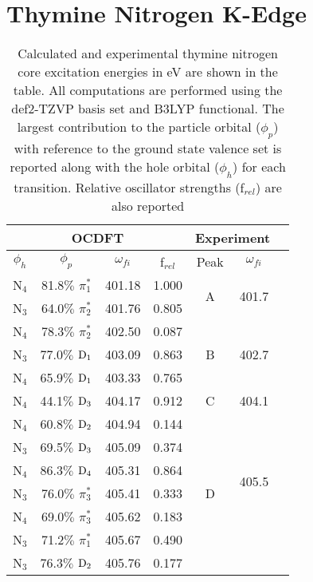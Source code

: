 \documentclass[12pt]{article}
\begin{document}
\section{Thymine Nitrogen K-Edge}
        \begin{table}[!h]
        \footnotesize
 \centering
   \caption{Calculated and experimental thymine nitrogen core excitation energies in eV are shown in the table. All computations are performed using the def2-TZVP basis set and B3LYP functional. The largest contribution to the particle orbital ($\phi_p$) with reference to the ground state valence set is reported along with the hole orbital ($\phi_h$) for each transition. Relative oscillator strengths (f$_{rel}$) are also reported}
     \begin{tabular}{c@{\hskip 0.22in}c@{\hskip 0.22in}c@{\hskip 0.22in}c@{\hskip 0.52in}c@{\hskip 0.22in}c@{\hskip 0.22in}c}
     \hline
     \hline
   \multicolumn{4}{c}{OCDFT} &\multicolumn{2}{c}{Experiment} \\
   \hline
 $\phi_h$ &  $\phi_p$ & $\omega_{fi}$ & f$_{rel}$ & Peak &  $\omega_{fi}$   \\
   \hline
    N$_4$
 &   81.8$\%$ $\pi_1^*$  & 401.18 & 1.000 & \multirow{2}{*}{A} & \multirow{2}{*}{401.7} \\
    N$_3$
 &   64.0$\%$ $\pi_2^*$  & 401.76 & 0.805 
 \vspace{0.1in}\\
    N$_4$
 &   78.3$\%$ $\pi_2^*$  & 402.50 & 0.087 & \multirow{3}{*}{B} & \multirow{3}{*}{402.7}\\
    N$_3$
 &   77.0$\%$ $\rm D_1$  & 403.09 & 0.863 \\
    N$_4$
 &   65.9$\%$ $\rm D_1$  & 403.33 & 0.765 
 \vspace{0.1in}\\
    N$_4$
 &   44.1$\%$ $\rm D_3$  & 404.17 & 0.912 & C & 404.1 
 \vspace{0.1in}\\
    N$_4$
 &   60.8$\%$ $\rm D_2$  & 404.94 & 0.144 & \multirow{7}{*}{D} & \multirow{6}{*}{405.5}\\
    N$_3$
 &   69.5$\%$ $\rm D_3$  & 405.09 & 0.374 \\
    N$_4$
 &   86.3$\%$ $\rm D_4$  & 405.31 & 0.864 \\
    N$_3$
 &   76.0$\%$ $\pi_3^*$  & 405.41 & 0.333 \\
    N$_4$
 &   69.0$\%$ $\pi_3^*$  & 405.62 & 0.183 \\
    N$_3$
 &   71.2$\%$ $\pi_1^*$  & 405.67 & 0.490 \\
    N$_3$
 &   76.3$\%$ $\rm D_2$  & 405.76 & 0.177 \\
 \hline
 \hline
 \end{tabular}
   \label{table: thymine_k_nitrogen}
\end{table}
\newpage
\end{document}
